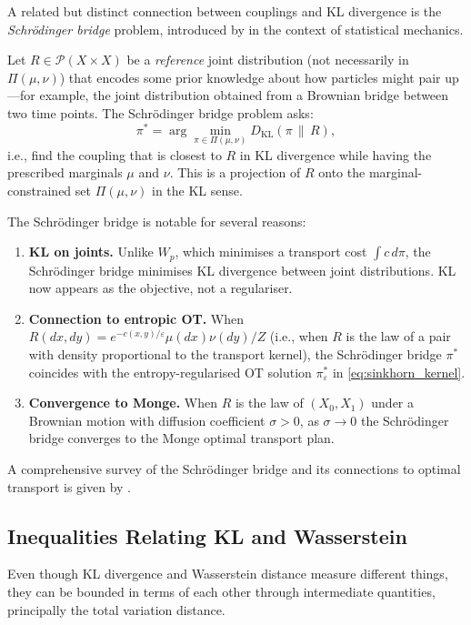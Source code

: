 \documentclass[12pt]{article}
\newcommand{\KL}[2]{D_{\mathrm{KL}}\!\left(#1\,\|\,#2\right)}
\newcommand{\calP}{\mathcal{P}}
\begin{document}
A related but distinct connection between couplings and KL
divergence is the \emph{Schr\"odinger bridge} problem, introduced
by \citet{Schrodinger1931} in the context of statistical mechanics.

Let $R \in \calP(X \times X)$ be a \emph{reference} joint
distribution (not necessarily in $\Pi(\mu,\nu)$) that encodes
some prior knowledge about how particles might pair up---for
example, the joint distribution obtained from a Brownian bridge
between two time points.  The Schr\"odinger bridge problem asks:
\begin{equation}\label{eq:schrod}
  \pi^* = \arg\min_{\pi \in \Pi(\mu,\nu)} \KL{\pi}{R},
\end{equation}
i.e., find the coupling that is closest to $R$ in KL divergence
while having the prescribed marginals $\mu$ and $\nu$.  This is a
projection of $R$ onto the marginal-constrained set $\Pi(\mu,\nu)$
in the KL sense.

The Schr\"odinger bridge is notable for several reasons:
\begin{enumerate}
  \item \textbf{KL on joints.}  Unlike $W_p$, which minimises
    a transport cost $\int c\,d\pi$, the Schr\"odinger bridge
    minimises KL divergence between joint distributions.  KL
    now appears as the objective, not a regulariser.
  \item \textbf{Connection to entropic OT.}  When
    $R(dx,dy) = e^{-c(x,y)/\varepsilon}\mu(dx)\nu(dy)/Z$
    (i.e., when $R$ is the law of a pair with density
    proportional to the transport kernel), the Schr\"odinger
    bridge $\pi^*$ coincides with the entropy-regularised OT
    solution $\pi^*_\varepsilon$ in \eqref{eq:sinkhorn_kernel}.
  \item \textbf{Convergence to Monge.}  When $R$ is the
    law of $(X_0, X_1)$ under a Brownian motion with diffusion
    coefficient $\sigma > 0$, as $\sigma \to 0$ the
    Schr\"odinger bridge converges to the Monge optimal
    transport plan.
\end{enumerate}
A comprehensive survey of the Schr\"odinger bridge and its
connections to optimal transport is given by \citet{Leonard2014}.

\subsection{Inequalities Relating KL and Wasserstein}
\label{sec:inequalities}

Even though KL divergence and Wasserstein distance measure
different things, they can be bounded in terms of each other
through intermediate quantities, principally the total variation
distance.
\end{document}
